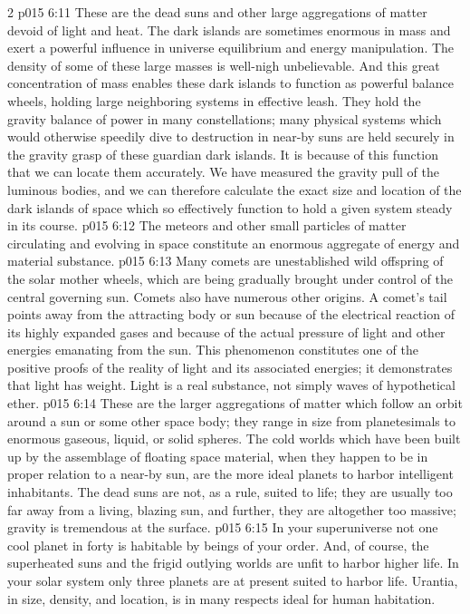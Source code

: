\begin{multicols}{2}
\pc \vs p015 6:11  These are the dead suns and other large aggregations of matter devoid of light and heat. The dark islands are sometimes enormous in mass and exert a powerful influence in universe equilibrium and energy manipulation. The density of some of these large masses is well\hyp{}nigh unbelievable. And this great concentration of mass enables these dark islands to function as powerful balance wheels, holding large neighboring systems in effective leash. They hold the gravity balance of power in many constellations; many physical systems which would otherwise speedily dive to destruction in near\hyp{}by suns are held securely in the gravity grasp of these guardian dark islands. It is because of this function that we can locate them accurately. We have measured the gravity pull of the luminous bodies, and we can therefore calculate the exact size and location of the dark islands of space which so effectively function to hold a given system steady in its course.
\pc \vs p015 6:12  The meteors and other small particles of matter circulating and evolving in space constitute an enormous aggregate of energy and material substance.
\vs p015 6:13 Many comets are unestablished wild offspring of the solar mother wheels, which are being gradually brought under control of the central governing sun. Comets also have numerous other origins. A comet’s tail points away from the attracting body or sun because of the electrical reaction of its highly expanded gases and because of the actual pressure of light and other energies emanating from the sun. This phenomenon constitutes one of the positive proofs of the reality of light and its associated energies; it demonstrates that light has weight. Light is a real substance, not simply waves of hypothetical ether.
\pc \vs p015 6:14  These are the larger aggregations of matter which follow an orbit around a sun or some other space body; they range in size from planetesimals to enormous gaseous, liquid, or solid spheres. The cold worlds which have been built up by the assemblage of floating space material, when they happen to be in proper relation to a near\hyp{}by sun, are the more ideal planets to harbor intelligent inhabitants. The dead suns are not, as a rule, suited to life; they are usually too far away from a living, blazing sun, and further, they are altogether too massive; gravity is tremendous at the surface.
\vs p015 6:15 In your superuniverse not one cool planet in forty is habitable by beings of your order. And, of course, the superheated suns and the frigid outlying worlds are unfit to harbor higher life. In your solar system only three planets are at present suited to harbor life. Urantia, in size, density, and location, is in many respects ideal for human habitation.

\end{multicols}
